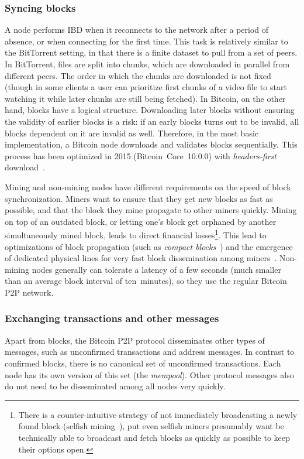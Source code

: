 \subsubsection*{Syncing blocks}
A node performs IBD when it reconnects to the network after a period of absence, or when connecting for the first time.
This task is relatively similar to the BitTorrent setting, in that there is a finite dataset to pull from a set of peers.
In BitTorrent, files are split into chunks, which are downloaded in parallel from different peers.
The order in which the chunks are downloaded is not fixed (though in some clients a user can prioritize first chunks of a video file to start watching it while later chunks are still being fetched).
In Bitcoin, on the other hand, blocks have a logical structure.
Downloading later blocks without ensuring the validity of earlier blocks is a risk: if an early blocks turns out to be invalid, all blocks dependent on it are invalid as well.
Therefore, in the most basic implementation, a Bitcoin node downloads and validates blocks sequentially.
This process has been optimized in 2015 (Bitcoin~Core~10.0.0) with \textit{headers-first} download~\cite{Core2015}.

Mining and non-mining nodes have different requirements on the speed of block synchronization.
Miners want to ensure that they get new blocks as fast as possible, and that the block they mine propagate to other miners quickly.
Mining on top of an outdated block, or letting one's block get orphaned by another simultaneously mined block, leads to direct financial losses\footnote{There is a counter-intuitive strategy of not immediately broadcasting a newly found block (selfish mining~\cite{Eyal2018}), put even selfish miners presumably want be technically able to broadcast and fetch blocks as quickly as possible to keep their options open.}.
This lead to optimizations of block propagation (such as \textit{compact blocks}~\cite{Core2016}) and the emergence of dedicated physical lines for very fast block dissemination among miners~\cite{FALCON, FIBRE}.
Non-mining nodes generally can tolerate a latency of a few seconds (much smaller than an average block interval of ten~minutes), so they use the regular Bitcoin P2P network.
	
\subsubsection*{Exchanging transactions and other messages}
Apart from blocks, the Bitcoin P2P protocol disseminates other types of messages, such as unconfirmed transactions and address messages.
In contrast to confirmed blocks, there is no canonical set of unconfirmed transactions.
Each node has its own version of this set (the \textit{mempool}).
Other protocol messages also do not need to be disseminated among all nodes very quickly.

